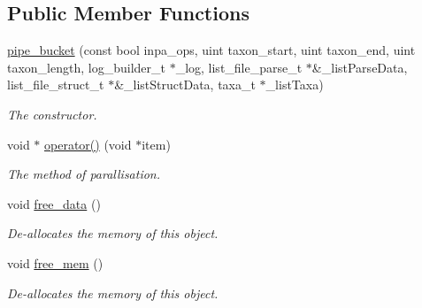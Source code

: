 \subsection*{Public Member Functions}
\begin{DoxyCompactItemize}
\item 
\hypertarget{classpipe__bucket_ab748c79965b28322088075e169d2a6b7}{
\hyperlink{classpipe__bucket_ab748c79965b28322088075e169d2a6b7}{pipe\_\-bucket} (const bool inpa\_\-ops, uint taxon\_\-start, uint taxon\_\-end, uint taxon\_\-length, log\_\-builder\_\-t $\ast$\_\-log, list\_\-file\_\-parse\_\-t $\ast$\&\_\-listParseData, list\_\-file\_\-struct\_\-t $\ast$\&\_\-listStructData, taxa\_\-t $\ast$\_\-listTaxa)}
\label{classpipe__bucket_ab748c79965b28322088075e169d2a6b7}

\begin{DoxyCompactList}\small\item\em The constructor. \end{DoxyCompactList}\item 
\hypertarget{classpipe__bucket_a00625ed2c91b93682543da468d76b9e3}{
void $\ast$ \hyperlink{classpipe__bucket_a00625ed2c91b93682543da468d76b9e3}{operator()} (void $\ast$item)}
\label{classpipe__bucket_a00625ed2c91b93682543da468d76b9e3}

\begin{DoxyCompactList}\small\item\em The method of parallisation. \end{DoxyCompactList}\item 
\hypertarget{classpipe__bucket_a768f810546b7cca051a90d031651ebac}{
void \hyperlink{classpipe__bucket_a768f810546b7cca051a90d031651ebac}{free\_\-data} ()}
\label{classpipe__bucket_a768f810546b7cca051a90d031651ebac}

\begin{DoxyCompactList}\small\item\em De-\/allocates the memory of this object. \end{DoxyCompactList}\item 
\hypertarget{classpipe__bucket_a84b54ed6a6ab8f48a2e280aad082f107}{
void \hyperlink{classpipe__bucket_a84b54ed6a6ab8f48a2e280aad082f107}{free\_\-mem} ()}
\label{classpipe__bucket_a84b54ed6a6ab8f48a2e280aad082f107}

\begin{DoxyCompactList}\small\item\em De-\/allocates the memory of this object. \end{DoxyCompactList}\end{DoxyCompactItemize}
